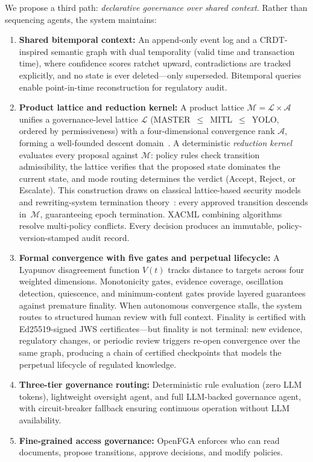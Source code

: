 \documentclass[11pt]{article}
\begin{document}
We propose a third path: \emph{declarative governance over shared context}. Rather than sequencing agents, the system maintains:

\begin{enumerate}
  \item \textbf{Shared bitemporal context:} An append-only event log and a CRDT-inspired semantic graph with dual temporality (valid time and transaction time), where confidence scores ratchet upward, contradictions are tracked explicitly, and no state is ever deleted---only superseded. Bitemporal queries enable point-in-time reconstruction for regulatory audit.

  \item \textbf{Product lattice and reduction kernel:} A product lattice $\mathcal{M} = \mathcal{L} \times \mathcal{A}$ unifies a governance-level lattice $\mathcal{L}$ (MASTER~$\leq$~MITL~$\leq$~YOLO, ordered by permissiveness) with a four-dimensional convergence rank $\mathcal{A}$, forming a well-founded descent domain~\cite{davey2002}. A deterministic \emph{reduction kernel} evaluates every proposal against $\mathcal{M}$: policy rules check transition admissibility, the lattice verifies that the proposed state dominates the current state, and mode routing determines the verdict (Accept, Reject, or Escalate). This construction draws on classical lattice-based security models~\cite{denning1976,bell1973} and rewriting-system termination theory~\cite{baader1998}: every approved transition descends in~$\mathcal{M}$, guaranteeing epoch termination. XACML combining algorithms~\cite{xacml2013} resolve multi-policy conflicts. Every decision produces an immutable, policy-version-stamped audit record.

  \item \textbf{Formal convergence with five gates and perpetual lifecycle:} A Lyapunov disagreement function $V(t)$ tracks distance to targets across four weighted dimensions. Monotonicity gates, evidence coverage, oscillation detection, quiescence, and minimum-content gates provide layered guarantees against premature finality. When autonomous convergence stalls, the system routes to structured human review with full context. Finality is certified with Ed25519-signed JWS certificates---but finality is not terminal: new evidence, regulatory changes, or periodic review triggers re-open convergence over the same graph, producing a chain of certified checkpoints that models the perpetual lifecycle of regulated knowledge.

  \item \textbf{Three-tier governance routing:} Deterministic rule evaluation (zero LLM tokens), lightweight oversight agent, and full LLM-backed governance agent, with circuit-breaker fallback ensuring continuous operation without LLM availability.

  \item \textbf{Fine-grained access governance:} OpenFGA enforces who can read documents, propose transitions, approve decisions, and modify policies.
\end{enumerate}
\end{document}
